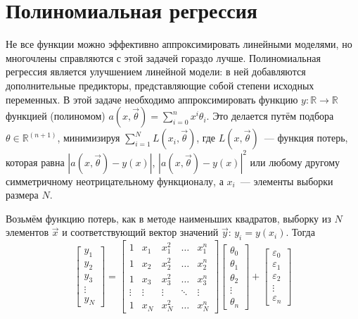

\section{Полиномиальная регрессия}

Не все функции можно эффективно аппроксимировать линейными моделями, но многочлены справляются с этой задачей гораздо лучше. Полиномиальная регрессия является улучшением линейной модели: в ней добавляются дополнительные предикторы, представляющие собой степени исходных переменных. В этой задаче необходимо аппроксимировать функцию $y:\mathbb{R} \rightarrow \mathbb{R}$ функцией (полиномом) $a(x, \vec{\theta}) =  \sum\limits_{i=0}^n x^i \theta_{i}$. Это делается путём подбора $\theta\in\mathbb{R}^{(n+1)}$, минимизируя
$\sum\limits_{i=1}^N L(x_i,\vec{\theta})$, где $L(x,\vec{\theta})$~--- функция потерь, которая равна $|a(x,\vec{\theta})-y(x)|$, $|a(x,\vec{\theta})-y(x)|^2$ или любому другому симметричному неотрицательному функционалу, а $x_i$~--- элементы выборки размера $N$.

Возьмём функцию потерь, как в методе наименьших квадратов, выборку из $N$ элементов $\vec{x}$ и соответствующий вектор значений $\vec{y}:\, y_i = y(x_i)$. 
Тогда $$\displaystyle {\begin{bmatrix}y_{1}\\y_{2}\\y_{3}\\\vdots \\y_{N}\end{bmatrix}}={\begin{bmatrix}1&x_{1}&x_{1}^{2}&\dots &x_{1}^{n}\\1&x_{2}&x_{2}^{2}&\dots &x_{2}^{n}\\1&x_{3}&x_{3}^{2}&\dots &x_{3}^{n}\\\vdots &\vdots &\vdots &\ddots &\vdots \\1&x_{N}&x_{N}^{2}&\dots &x_{N}^{n}\end{bmatrix}}{\begin{bmatrix}\theta _{0}\\\theta _{1}\\\theta _{2}\\\vdots \\\theta _{n}\end{bmatrix}}+
\begin{bmatrix}
\varepsilon _{0}\\\varepsilon _{1}\\\varepsilon _{2}\\\vdots \\\varepsilon _{n}
\end{bmatrix}$$

